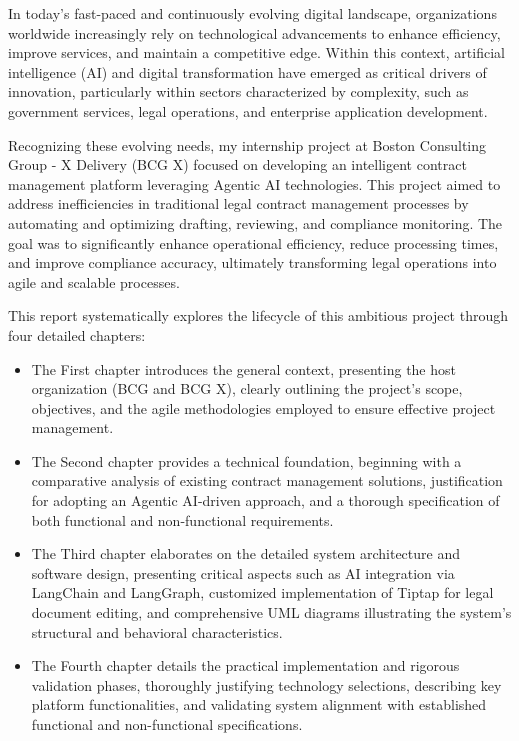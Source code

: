 
In today's fast-paced and continuously evolving digital landscape, organizations worldwide increasingly rely on technological advancements to enhance efficiency, improve services, and maintain a competitive edge. Within this context, artificial intelligence (AI) and digital transformation have emerged as critical drivers of innovation, particularly within sectors characterized by complexity, such as government services, legal operations, and enterprise application development.\mynewline

Recognizing these evolving needs, my internship project at Boston Consulting Group - X Delivery (BCG X) focused on developing an intelligent contract management platform leveraging Agentic AI technologies. This project aimed to address inefficiencies in traditional legal contract management processes by automating and optimizing drafting, reviewing, and compliance monitoring. The goal was to significantly enhance operational efficiency, reduce processing times, and improve compliance accuracy, ultimately transforming legal operations into agile and scalable processes.\mynewline

This report systematically explores the lifecycle of this ambitious project through four detailed chapters:

\begin{itemize}
  \item {The First chapter} introduces the general context, presenting the host organization (BCG and BCG X), clearly outlining the project's scope, objectives, and the agile methodologies employed to ensure effective project management.
  \item {The Second chapter} provides a technical foundation, beginning with a comparative analysis of existing contract management solutions, justification for adopting an Agentic AI-driven approach, and a thorough specification of both functional and non-functional requirements.
  \item {The Third chapter} elaborates on the detailed system architecture and software design, presenting critical aspects such as AI integration via LangChain and LangGraph, customized implementation of Tiptap for legal document editing, and comprehensive UML diagrams illustrating the system's structural and behavioral characteristics.
  \item {The Fourth chapter} details the practical implementation and rigorous validation phases, thoroughly justifying technology selections, describing key platform functionalities, and validating system alignment with established functional and non-functional specifications.
\end{itemize}